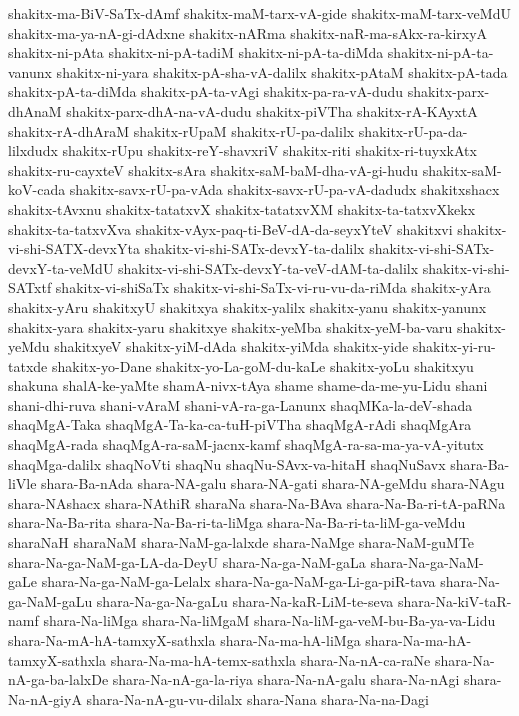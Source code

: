 {shakitx-ma-BiV-SaTx-dAmf
shakitx-maM-tarx-vA-gide
shakitx-maM-tarx-veMdU
shakitx-ma-ya-nA-gi-dAdxne
shakitx-nARma
shakitx-naR-ma-sAkx-ra-kirxyA
shakitx-ni-pAta
shakitx-ni-pA-tadiM
shakitx-ni-pA-ta-diMda
shakitx-ni-pA-ta-vanunx
shakitx-ni-yara
shakitx-pA-sha-vA-dalilx
shakitx-pAtaM
shakitx-pA-tada
shakitx-pA-ta-diMda
shakitx-pA-ta-vAgi
shakitx-pa-ra-vA-dudu
shakitx-parx-dhAnaM
shakitx-parx-dhA-na-vA-dudu
shakitx-piVTha
shakitx-rA-KAyxtA
shakitx-rA-dhAraM
shakitx-rUpaM
shakitx-rU-pa-dalilx
shakitx-rU-pa-da-lilxdudx
shakitx-rUpu
shakitx-reY-shavxriV
shakitx-riti
shakitx-ri-tuyxkAtx
shakitx-ru-cayxteV
shakitx-sAra
shakitx-saM-baM-dha-vA-gi-hudu
shakitx-saM-koV-cada
shakitx-savx-rU-pa-vAda
shakitx-savx-rU-pa-vA-dadudx
shakitxshacx
shakitx-tAvxnu
shakitx-tatatxvX
shakitx-tatatxvXM
shakitx-ta-tatxvXkekx
shakitx-ta-tatxvXva
shakitx-vAyx-paq-ti-BeV-dA-da-seyxYteV
shakitxvi
shakitx-vi-shi-SATX-devxYta
shakitx-vi-shi-SATx-devxY-ta-dalilx
shakitx-vi-shi-SATx-devxY-ta-veMdU
shakitx-vi-shi-SATx-devxY-ta-veV-dAM-ta-dalilx
shakitx-vi-shi-SATxtf
shakitx-vi-shiSaTx
shakitx-vi-shi-SaTx-vi-ru-vu-da-riMda
shakitx-yAra
shakitx-yAru
shakitxyU
shakitxya
shakitx-yalilx
shakitx-yanu
shakitx-yanunx
shakitx-yara
shakitx-yaru
shakitxye
shakitx-yeMba
shakitx-yeM-ba-varu
shakitx-yeMdu
shakitxyeV
shakitx-yiM-dAda
shakitx-yiMda
shakitx-yide
shakitx-yi-ru-tatxde
shakitx-yo-Dane
shakitx-yo-La-goM-du-kaLe
shakitx-yoLu
shakitxyu
shakuna
shalA-ke-yaMte
shamA-nivx-tAya
shame
shame-da-me-yu-Lidu
shani
shani-dhi-ruva
shani-vAraM
shani-vA-ra-ga-Lanunx
shaqMKa-la-deV-shada
shaqMgA-Taka
shaqMgA-Ta-ka-ca-tuH-piVTha
shaqMgA-rAdi
shaqMgAra
shaqMgA-rada
shaqMgA-ra-saM-jacnx-kamf
shaqMgA-ra-sa-ma-ya-vA-yitutx
shaqMga-dalilx
shaqNoVti
shaqNu
shaqNu-SAvx-va-hitaH
shaqNuSavx
shara-Ba-liVle
shara-Ba-nAda
shara-NA-galu
shara-NA-gati
shara-NA-geMdu
shara-NAgu
shara-NAshacx
shara-NAthiR
sharaNa
shara-Na-BAva
shara-Na-Ba-ri-tA-paRNa
shara-Na-Ba-rita
shara-Na-Ba-ri-ta-liMga
shara-Na-Ba-ri-ta-liM-ga-veMdu
sharaNaH
sharaNaM
shara-NaM-ga-lalxde
shara-NaMge
shara-NaM-guMTe
shara-Na-ga-NaM-ga-LA-da-DeyU
shara-Na-ga-NaM-gaLa
shara-Na-ga-NaM-gaLe
shara-Na-ga-NaM-ga-Lelalx
shara-Na-ga-NaM-ga-Li-ga-piR-tava
shara-Na-ga-NaM-gaLu
shara-Na-ga-Na-gaLu
shara-Na-kaR-LiM-te-seva
shara-Na-kiV-taR-namf
shara-Na-liMga
shara-Na-liMgaM
shara-Na-liM-ga-veM-bu-Ba-ya-va-Lidu
shara-Na-mA-hA-tamxyX-sathxla
shara-Na-ma-hA-liMga
shara-Na-ma-hA-tamxyX-sathxla
shara-Na-ma-hA-temx-sathxla
shara-Na-nA-ca-raNe
shara-Na-nA-ga-ba-lalxDe
shara-Na-nA-ga-la-riya
shara-Na-nA-galu
shara-Na-nAgi
shara-Na-nA-giyA
shara-Na-nA-gu-vu-dilalx
shara-Nana
shara-Na-na-Dagi
}
